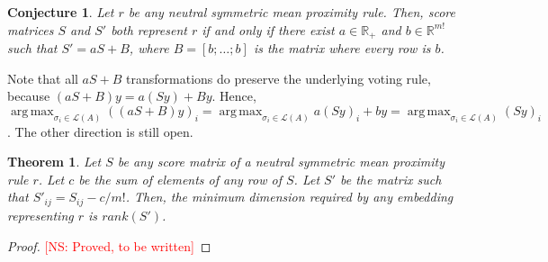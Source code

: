 \documentclass[10pt,letterpaper]{article}
\newcommand{\calL}{{\mathcal{L}}}
\newcommand{\rank}{{\calL(A)}}
\DeclareMathOperator*{\argmax}{arg\,max}
\newtheorem{theorem}{Theorem}
\newtheorem{conjecture}{Conjecture}
\newcommand{\kibitz}[2]{\ifnum\Comments=1\textcolor{#1}{#2}\fi}
\newcommand{\cns}[1]{\kibitz{red} {[NS: #1]}}
\begin{document}
\begin{conjecture}
Let $r$ be any neutral symmetric mean proximity rule. Then, score matrices $S$ and $S'$ both represent $r$ if and only if there exist $a \in \mathbb{R}_{+}$ and $b \in \mathbb{R}^{m!}$ such that $S' = aS+B$, where $B = [b;\ldots;b]$ is the matrix where every row is $b$. 
\label{conj:equivalent-score-matrix}
\end{conjecture}
Note that all $aS+B$ transformations do preserve the underlying voting rule, because $(aS+B)y = a(Sy)+By$. Hence, $\argmax_{\sigma_i \in \rank} ((aS+B)y)_i = \argmax_{\sigma_i \in \rank} a(Sy)_i + by = \argmax_{\sigma_i \in \rank} (Sy)_i$. The other direction is still open.

\begin{theorem}
Let $S$ be any score matrix of a neutral symmetric mean proximity rule $r$. Let $c$ be the sum of elements of any row of $S$. Let $S'$ be the matrix such that $S'_{ij} = S_{ij}-c/{m!}$. Then, the minimum dimension required by any embedding representing $r$ is $rank(S')$. 
\label{thm:dimension}
\end{theorem}
\begin{proof}
\cns{Proved, to be written}
\end{proof}
%
%
%
\end{document}
